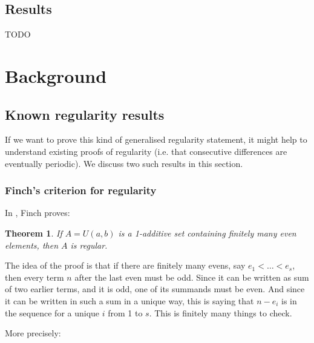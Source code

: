 \documentclass{article}
\newtheorem{theorem}{Theorem}[section]
\theoremstyle{definition}
\theoremstyle{remark}
\numberwithin{equation}{section}
\begin{document}
\subsection{Results}

TODO

\section{Background}

\subsection{Known regularity results}

If we want to prove this kind of generalised regularity statement, it
might help to understand existing proofs of regularity (i.e. that
consecutive differences are eventually periodic).  We discuss two such
results in this section.

\subsubsection{Finch's criterion for regularity}

In \cite{regularity_criterion_finch}, Finch proves:

\begin{theorem}
If $A = U(a,b)$ is a 1-additive set containing finitely many even
elements, then $A$ is regular.  
\end{theorem}

The idea of the proof is that if there are finitely many evens, say
$e_1 < \ldots < e_s$, then every term $n$ after the last even must be
odd.  Since it can be written as sum of two earlier terms, and it is
odd, one of its summands must be even.  And since it can be written in
such a sum in a unique way, this is saying that $n - e_i$ is in the
sequence for a unique $i$ from 1 to $s$.  This is finitely many things
to check.

More precisely:
\end{document}
